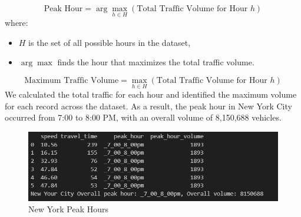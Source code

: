 \begin{equation}
\text{Peak Hour} = \arg \max_{h \in H} \left( \text{Total Traffic Volume for Hour } h \right)
\end{equation}
where:
\begin{itemize}
    \item \( H \) is the set of all possible hours in the dataset,
    \item \( \arg \max \) finds the hour that maximizes the total traffic volume.
\end{itemize}

\begin{equation}
\text{Maximum Traffic Volume} = \max_{h \in H} \left( \text{Total Traffic Volume for Hour } h \right)
\end{equation}
\newline
We calculated the total traffic for each hour and identified the maximum volume for each record across the dataset. As a result, the peak hour in New York City occurred from 7:00 to 8:00 PM, with an overall volume of 8,150,688 vehicles.
\begin{figure}[H]
    \centering
    \includegraphics[width=1\linewidth]{figures/peak_huours.PNG}
    \caption{New York Peak Hours}
    \label{fig:new_york_peak_hours}
\end{figure}

